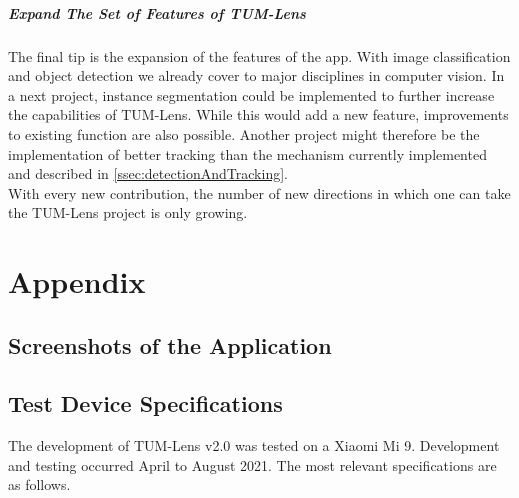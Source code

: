 \documentclass[
			   fontsize=11pt,
               paper=a4,
               bibliography=totoc,
               idxtotoc,
               headsepline,
               footsepline,
               footinclude=false,
               BCOR=12mm,
               DIV=13,
               openany,   %
               ]
               {scrbook}
\begin{document}
\subsubsection{Expand The Set of Features of TUM-Lens}

The final tip is the expansion of the features of the app. With image classification and object detection we already cover to major disciplines in computer vision. In a next project, instance segmentation could be implemented to further increase the capabilities of TUM-Lens. While this would add a new feature, improvements to existing function are also possible. Another project might therefore be the implementation of better tracking than the mechanism currently implemented and described in \autoref{ssec:detectionAndTracking}. \\

With every new contribution, the number of new directions in which one can take the TUM-Lens project is only growing.




\appendix


\part{Appendix}


\chapter{Screenshots of the Application}


\chapter{Test Device Specifications} \label{chap:specs}

The development of TUM-Lens v2.0 was tested on a Xiaomi Mi 9. Development and testing occurred April to August 2021. The most relevant specifications are as follows. 
\end{document}
